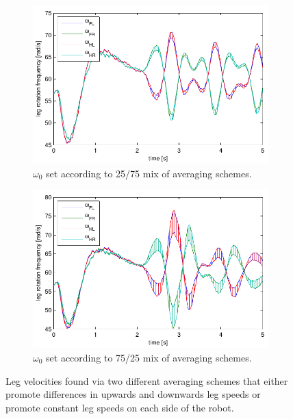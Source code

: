\begin{figure}[t]
    \centering
    \begin{subfigure}[b]{0.49\textwidth}
        \centering
        \includegraphics[width = \textwidth]{figures/omega25.pdf}
        \caption{$\omega_0$ set according to 25/75 mix of averaging schemes.}
        \label{fig:omega25}
    \end{subfigure}
    \begin{subfigure}[b]{0.49\textwidth}
        \centering
        \includegraphics[width = \textwidth]{figures/omega75.pdf}
        \caption{$\omega_0$ set according to 75/25 mix of averaging schemes.}
        \label{fig:omega75}
    \end{subfigure}
    \caption{Leg velocities found via two different averaging schemes that either promote differences in upwards and downwards leg speeds or promote constant leg speeds on each side of the robot.}
    \label{fig:omega0}
\end{figure}
